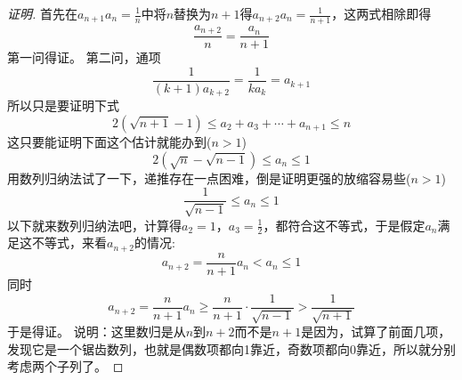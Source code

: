 \begin{proof}[证明]
  首先在$a_{n+1}a_n=\frac{1}{n}$中将$n$替换为$n+1$得$a_{n+2}a_{n}=\frac{1}{n+1}$，这两式相除即得
\[ \frac{a_{n+2}}{n} = \frac{a_n}{n+1} \]
第一问得证。
第二问，通项
\[ \frac{1}{(k+1)a_{k+2}} = \frac{1}{ka_k} = a_{k+1} \]
所以只是要证明下式
\[ 2(\sqrt{n+1}-1) \leqslant a_2+a_3+\cdots+a_{n+1} \leqslant n \]
这只要能证明下面这个估计就能办到($n>1$)
\[ 2(\sqrt{n}-\sqrt{n-1}) \leqslant a_n \leqslant 1 \]
用数列归纳法试了一下，递推存在一点困难，倒是证明更强的放缩容易些($n>1$)
\[ \frac{1}{\sqrt{n-1}} \leqslant a_n \leqslant 1 \]
以下就来数列归纳法吧，计算得$a_2=1$，$a_3=\frac{1}{2}$，都符合这不等式，于是假定$a_n$满足这不等式，来看$a_{n+2}$的情况:
\[ a_{n+2} = \frac{n}{n+1}a_n < a_n \leqslant 1 \]
同时
\[ a_{n+2} = \frac{n}{n+1}a_n \geqslant \frac{n}{n+1} \cdot \frac{1}{\sqrt{n-1}} > \frac{1}{\sqrt{n+1}} \]
于是得证。
说明：这里数归是从$n$到$n+2$而不是$n+1$是因为，试算了前面几项，发现它是一个锯齿数列，也就是偶数项都向1靠近，奇数项都向0靠近，所以就分别考虑两个子列了。
\end{proof}


